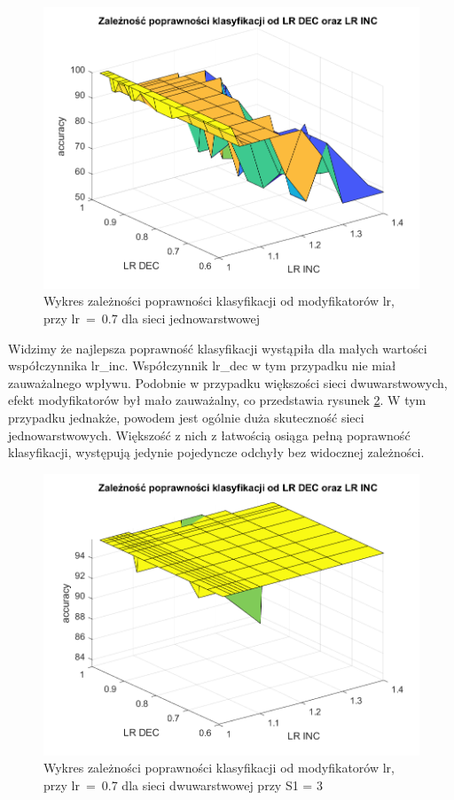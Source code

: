 \documentclass[12pt,twoside]{article}
\begin{document}
\begin{figure}[ht]
	\centering
	\includegraphics[width=16cm]{figures/IncDec_1.png}
	\caption{Wykres zależności poprawności klasyfikacji od modyfikatorów lr, przy lr~=~0.7 dla sieci jednowarstwowej}
	\label{Fig:IncDec1}
\end{figure}

Widzimy że najlepsza poprawność klasyfikacji wystąpiła dla małych wartości współczynnika lr\_inc.
Współczynnik lr\_dec w tym przypadku nie miał zauważalnego wpływu.
Podobnie w przypadku większości sieci dwuwarstwowych, efekt modyfikatorów był mało zauważalny, co przedstawia rysunek \ref{Fig:IncDec2}.
W tym przypadku jednakże, powodem jest ogólnie duża skuteczność sieci jednowarstwowych.
Większość z nich z łatwością osiąga pełną poprawność klasyfikacji, występują jedynie pojedyncze odchyły bez widocznej zależności.

\begin{figure}[ht]
	\centering
	\includegraphics[width=16cm]{figures/IncDec_2.png}
	\caption{Wykres zależności poprawności klasyfikacji od modyfikatorów lr, przy lr~=~0.7 dla sieci dwuwarstwowej przy S1 = 3}
	\label{Fig:IncDec2}
\end{figure}
\end{document}
